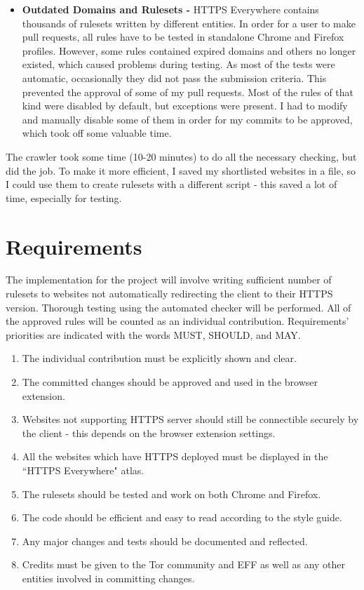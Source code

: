 \documentclass[a4paper, 12pt, titlepage]{article}
\begin{document}
\begin{itemize}
\item{\textbf{Outdated Domains and Rulesets - }HTTPS Everywhere contains thousands of rulesets written by different entities. In order for a user to make pull requests, all rules have to be tested in standalone Chrome and Firefox profiles. However, some rules contained expired domains and others no longer existed, which caused problems during testing. As most of the tests were automatic, occasionally they did not pass the submission criteria. This prevented the approval of some of my pull requests. Most of the rules of that kind were disabled by default, but exceptions were present. I had to modify and manually disable some of them in order for my commits to be approved, which took off some valuable time.}
\end{itemize}
The crawler took some time (10-20 minutes) to do all the necessary checking, but did the job. To make it more efficient, I saved my shortlisted websites in a file, so I could use them to create rulesets with a different script - this saved a lot of time, especially for testing.

\section{Requirements}
The implementation for the project will involve writing sufficient number of rulesets to websites not automatically redirecting the client to their HTTPS version. Thorough testing using the automated checker will be performed. All of the approved rules will be counted as an individual contribution. Requirements' priorities are indicated with the words MUST, SHOULD, and MAY.

\begin{enumerate}
\item{The individual contribution must be explicitly shown and clear.}
\item{The committed changes should be approved and used in the browser extension.}
\item{Websites not supporting HTTPS server should still be connectible securely by the client - this depends on the browser extension settings.}
\item{All the websites which have HTTPS deployed must be displayed in the ``HTTPS Everywhere" atlas.}
\item{The rulesets should be tested and work on both Chrome and Firefox.}
\item{The code should be efficient and easy to read according to the style guide.}
\item{Any major changes and tests should be documented and reflected.}
\item{Credits must be given to the Tor community and EFF as well as any other entities involved in committing changes.}
\end{enumerate}
\end{document}
